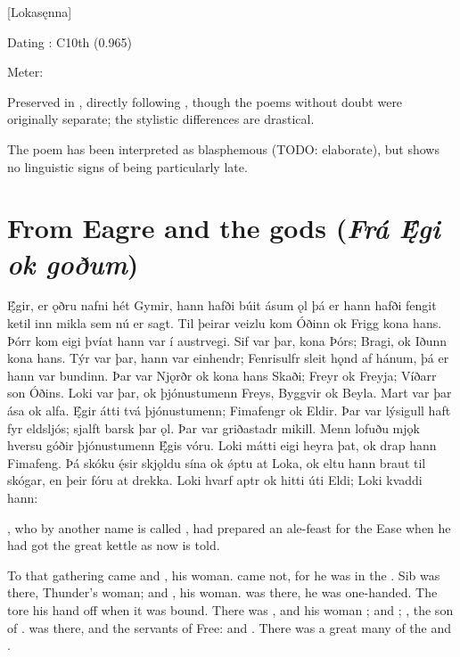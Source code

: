 [Lokasęnna]

\begin{flushright}%
Dating \parencite{Sapp2022}: C10th (0.965)

Meter: \Ljodahattr%
\end{flushright}

Preserved in \Regius, directly following \Hymiskvida, though the poems without doubt were originally separate; the stylistic differences are drastical.

The poem has been interpreted as blasphemous (TODO: elaborate), but shows no linguistic signs of being particularly late.

\sectionline

\section{From Eagre and the gods (\emph{Frá Ę́gi ok goðum})}

Ę́gir, er ǫðru nafni hét Gymir, hann hafði búit ásum ǫl þá er hann hafði fengit ketil inn mikla sem nú er sagt. Til þeirar veizlu kom Óðinn ok Frigg kona hans. Þórr kom eigi þvíat hann var í austrvegi. Sif var þar, kona Þórs; Bragi, ok Iðunn kona hans. Týr var þar, hann var einhendr; Fenrisulfr sleit hǫnd af hánum, þá er hann var bundinn. Þar var Njǫrðr ok kona hans Skaði; Freyr ok Freyja; Víðarr son Óðins. Loki var þar, ok þjónustumenn Freys, Byggvir ok Beyla. Mart var þar ása ok alfa. Ę́gir átti tvá þjónustumenn; Fimafengr ok Eldir. Þar var lýsigull haft fyr eldsljós; sjalft barsk þar ǫl. Þar var griðastadr mikill. Menn lofuðu mjǫk hversu góðir þjónustumenn Ę́gis vóru. Loki mátti eigi heyra þat, ok drap hann Fimafeng. Þá skóku ę́sir skjǫldu sína ok ǿptu at Loka, ok eltu hann braut til skógar, en þeir fóru at drekka. Loki hvarf aptr ok hitti úti Eldi; Loki kvaddi hann:

, who by another name is called , had prepared an ale-feast for the Ease when he had got the great kettle as now is told.

To that gathering came  and , his woman.  came not, for he was in the . Sib was there, Thunder’s woman;  and , his woman.  was there, he was one-handed. The  tore his hand off when it was bound. There was , and his woman ;  and ; , the son of .  was there, and the servants of Free:  and . There was a great many of the  and .


